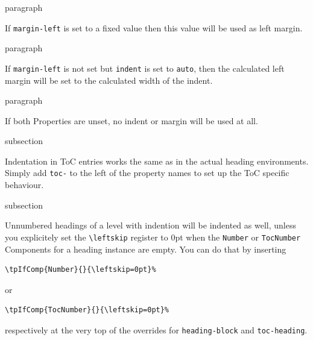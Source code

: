 \begin{heading}{paragraph}
\end{heading}


If \lstinline{margin-left} is set to a fixed value then this value
will be used as left margin.

\begin{heading}{paragraph}
\end{heading}


If \lstinline{margin-left} is not set but \lstinline{indent} is set to
\lstinline{auto}, then the calculated left margin will be set to the
calculated width of the indent.

\begin{heading}{paragraph}
\end{heading}

If both Properties are unset, no indent or margin will be used at all.


\begin{heading}[label=sec:hdg:toc-indent]{subsection}
\end{heading}

Indentation in ToC entries works the same as in the actual heading
environments. Simply add \lstinline{toc-} to the left of the property
names to set up the ToC specific behaviour.


\begin{heading}[label=sec:hdg:unnumbered-indent]{subsection}
\end{heading}

Unnumbered headings of a level with indention will be indented as
well, unless you explicitely set the \lstinline{\leftskip} register to
0pt when the \lstinline{Number} or \lstinline{TocNumber} Components
for a heading instance are empty.  You can do that by inserting
\begin{lstlisting}
\tpIfComp{Number}{}{\leftskip=0pt}%
\end{lstlisting}
or
\begin{lstlisting}
\tpIfComp{TocNumber}{}{\leftskip=0pt}%
\end{lstlisting}
respectively at the very top of the overrides for
\lstinline{heading-block} and \lstinline{toc-heading}.

